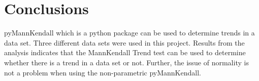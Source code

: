 \documentclass[11]{article}
\begin{document}
\section{Conclusions}
pyMannKendall which is a python package can be used to determine trends in a data set. Three different data sets were used in this project. Results from the analysis indicates that the MannKendall Trend test can be used to determine whether there is a trend in a data set or not. Further, the issue of normality is not a problem when using the non-parametric pyMannKendall. 
\end{document}
